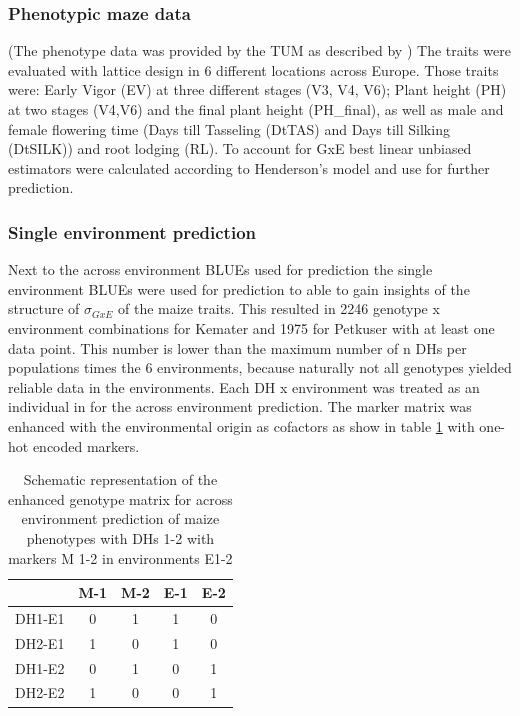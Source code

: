 \subsubsection{Phenotypic maze data}
(The phenotype data was provided by the TUM as described by \cite{holker2019european}) \newline The traits
were evaluated with lattice design in 6 different locations across Europe. Those traits were: Early Vigor
(EV) at three different stages (V3, V4, V6); Plant height (PH) at two stages (V4,V6) and the final plant
height (PH\_final), as well as male and female flowering time (Days till Tasseling (DtTAS) and Days till
Silking (DtSILK)) and root lodging (RL). To account for GxE best linear unbiased estimators were calculated
according to Henderson's model \cite{henderson1975best} and use for further prediction.

\subsubsection{Single environment prediction}
Next to the across environment BLUEs used for prediction the single environment BLUEs were used for prediction
to able to gain insights of the structure of $\sigma_{GxE}$ of the maize traits. This resulted in 2246
genotype x environment combinations for Kemater and 1975 for Petkuser with at least one data point. This
number is lower than the maximum number of n DHs per populations times the 6 environments, because naturally
not all genotypes yielded reliable data in the environments. Each DH x environment was treated as an
individual in for the across environment prediction. The marker matrix was enhanced with the environmental
origin as cofactors as show in table \ref{tab:envmarker} with one-hot encoded markers.

\onehalfspacing
\begin{table}[H]
 \centering
 \caption{Schematic representation of the enhanced genotype matrix for across environment prediction of maize phenotypes with DHs 1-2 with markers M 1-2 in environments E1-2}
 \label{tab:envmarker}
 \begin{tabular}{l|cccc}
  \toprule
      & M-1 & M-2 & E-1 & E-2 \\
  \midrule
  DH1-E1 & 0  & 1  & 1  & 0  \\
  DH2-E1 & 1  & 0  & 1  & 0  \\
  DH1-E2 & 0  & 1  & 0  & 1  \\
  DH2-E2 & 1  & 0  & 0  & 1  \\                      
  \bottomrule
 \end{tabular}
\end{table}
\doublespacing



